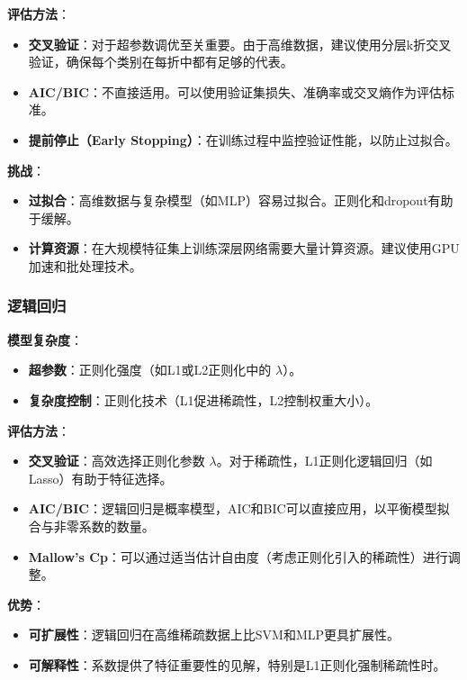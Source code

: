 \documentclass[11pt,a4paper]{article}
\begin{document}
\textbf{评估方法}：

\begin{itemize}
    \item \textbf{交叉验证}：对于超参数调优至关重要。由于高维数据，建议使用分层k折交叉验证，确保每个类别在每折中都有足够的代表。
    \item \textbf{AIC/BIC}：不直接适用。可以使用验证集损失、准确率或交叉熵作为评估标准。
    \item \textbf{提前停止（Early Stopping）}：在训练过程中监控验证性能，以防止过拟合。
\end{itemize}

\textbf{挑战}：

\begin{itemize}
    \item \textbf{过拟合}：高维数据与复杂模型（如MLP）容易过拟合。正则化和dropout有助于缓解。
    \item \textbf{计算资源}：在大规模特征集上训练深层网络需要大量计算资源。建议使用GPU加速和批处理技术。
\end{itemize}

\subsubsection{逻辑回归}

\textbf{模型复杂度}：

\begin{itemize}
    \item \textbf{超参数}：正则化强度（如L1或L2正则化中的 $\lambda$）。
    \item \textbf{复杂度控制}：正则化技术（L1促进稀疏性，L2控制权重大小）。
\end{itemize}

\textbf{评估方法}：

\begin{itemize}
    \item \textbf{交叉验证}：高效选择正则化参数 $\lambda$。对于稀疏性，L1正则化逻辑回归（如Lasso）有助于特征选择。
    \item \textbf{AIC/BIC}：逻辑回归是概率模型，AIC和BIC可以直接应用，以平衡模型拟合与非零系数的数量。
    \item \textbf{Mallow’s Cp}：可以通过适当估计自由度（考虑正则化引入的稀疏性）进行调整。
\end{itemize}

\textbf{优势}：

\begin{itemize}
    \item \textbf{可扩展性}：逻辑回归在高维稀疏数据上比SVM和MLP更具扩展性。
    \item \textbf{可解释性}：系数提供了特征重要性的见解，特别是L1正则化强制稀疏性时。
\end{itemize}
\end{document}
